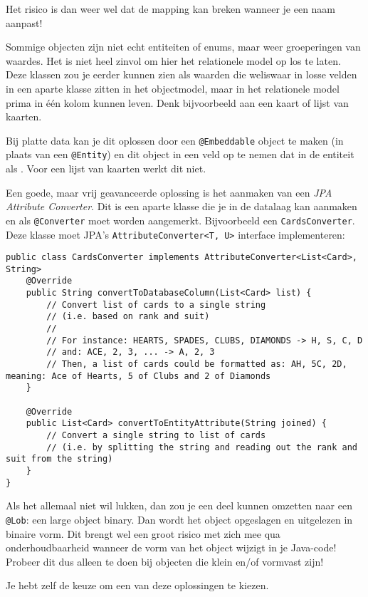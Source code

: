 Het risico is dan weer wel dat de 
mapping kan breken wanneer je een naam aanpast!

Sommige objecten zijn niet echt entiteiten of enums, maar weer 
groeperingen van waardes. Het is niet heel zinvol om hier 
het relationele model op los te laten. Deze klassen zou je 
eerder kunnen zien als waarden die weliswaar in losse velden 
in een aparte klasse zitten in het objectmodel, maar in het 
relationele model prima in één kolom kunnen leven.
Denk bijvoorbeeld aan een kaart of lijst van kaarten.

Bij platte data kan je dit oplossen door een 
\texttt{@Embeddable} object te maken (in plaats van een 
\texttt{@Entity}) en dit object in een  
veld op te nemen dat in de entiteit als .
Voor een lijst van kaarten werkt dit niet.

Een goede, maar vrij geavanceerde oplossing is het aanmaken 
van een \textit{JPA Attribute Converter}. Dit is een aparte 
klasse die je in de datalaag kan aanmaken en als \texttt{@Converter}
moet worden aangemerkt. Bijvoorbeeld een \texttt{CardsConverter}.
Deze klasse moet JPA's \texttt{AttributeConverter<T, U>}
interface implementeren: 

\begin{verbatim}
public class CardsConverter implements AttributeConverter<List<Card>, String>
    @Override
    public String convertToDatabaseColumn(List<Card> list) {
        // Convert list of cards to a single string 
        // (i.e. based on rank and suit)
        //
        // For instance: HEARTS, SPADES, CLUBS, DIAMONDS -> H, S, C, D
        // and: ACE, 2, 3, ... -> A, 2, 3
        // Then, a list of cards could be formatted as: AH, 5C, 2D, meaning: Ace of Hearts, 5 of Clubs and 2 of Diamonds
    }

    @Override
    public List<Card> convertToEntityAttribute(String joined) {
        // Convert a single string to list of cards
        // (i.e. by splitting the string and reading out the rank and suit from the string)
    }
}
\end{verbatim}

Als het allemaal niet wil lukken, dan zou je een deel kunnen omzetten naar een \texttt{@Lob}:
een large object binary. Dan wordt het object opgeslagen en uitgelezen 
in binaire vorm. Dit brengt wel een groot risico met zich mee qua onderhoudbaarheid
wanneer de vorm van het object wijzigt in je Java-code!
Probeer dit dus alleen te doen bij objecten die klein en/of vormvast zijn!

Je hebt zelf de keuze om een van deze oplossingen te kiezen.

